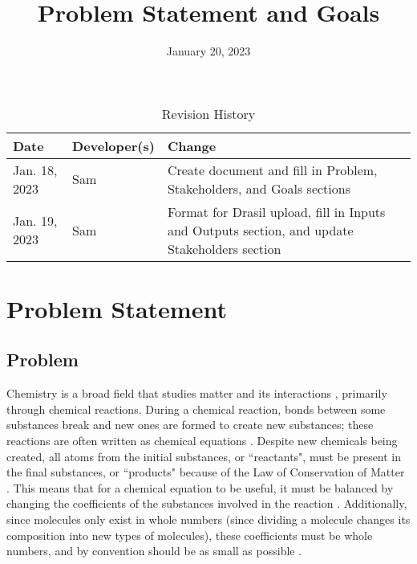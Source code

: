 \documentclass{article}
\title{Problem Statement and Goals\\\progname}
\author{\authname}
\date{January 20, 2023}
\begin{document}
\maketitle

\begin{table}[hp]
\caption{Revision History} \label{TblRevisionHistory}
\begin{tabularx}{\textwidth}{llX}
\toprule
\textbf{Date} & \textbf{Developer(s)} & \textbf{Change}\\
\midrule
Jan. 18, 2023 & Sam & Create document and fill in Problem, Stakeholders, and
Goals sections\\
Jan. 19, 2023 & Sam & Format for Drasil upload, fill in Inputs and Outputs
section, and update Stakeholders section\\
\bottomrule
\end{tabularx}
\end{table}

\section{Problem Statement}


\subsection{Problem}

Chemistry is a broad field that studies matter and its interactions
\cite{gordon_chm101_2023}, primarily through chemical reactions.
During a chemical reaction, bonds between some substances break and new ones are
formed to create new substances; these reactions are often written as chemical
equations \cite{lund_introduction_2023}. Despite new chemicals being created,
all atoms from the initial substances, or ``reactants", must be present in the
final substances, or ``products" because of the Law of Conservation of Matter
\cite{lund_introduction_2023}. This means that for a chemical equation to be
useful, it must be balanced by changing the coefficients of the substances
involved in the reaction \cite{lund_introduction_2023}. Additionally, since
molecules only exist in whole numbers (since dividing a molecule changes its
composition into new types of molecules), these coefficients must be whole
numbers, and by convention should be as small as possible
\cite{lund_introduction_2023}.
\end{document}
